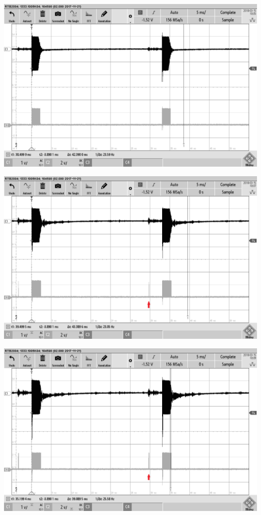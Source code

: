 \begin{minipage}{0.5\textwidth}
\includegraphics[width=1\textwidth%
]{Abbildungen/MessungenP2/5V/5m.PNG}
\label{fig:5v5m2}
\end{minipage}
\begin{minipage}{0.5\textwidth}
\includegraphics[width=1\textwidth%
]{Abbildungen/MessungenP2/10V/5mb.PNG}
\label{fig:10v5m}
\end{minipage}
\begin{minipage}{0.5\textwidth}
\includegraphics[width=1\textwidth%
]{Abbildungen/MessungenP2/15V/5mb.PNG}
\label{fig:15v5m}
\end{minipage}
